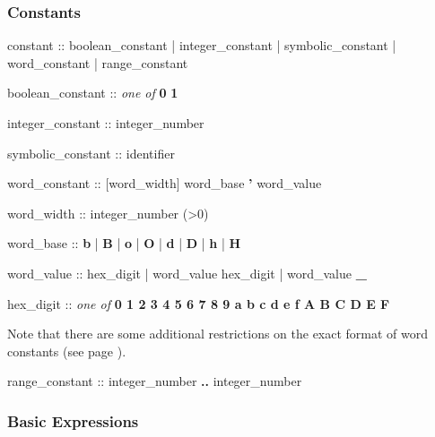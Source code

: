 \subsubsection{Constants}
\begin{Grammar}
constant ::
        boolean_constant
      | integer_constant
      | symbolic_constant
      | word_constant
      | range_constant
\end{Grammar}

\begin{Grammar}
boolean_constant :: \emph{one of}
        \textbf{0} \textbf{1}  
\end{Grammar}

\begin{Grammar}
integer_constant :: integer_number
\end{Grammar}

\begin{Grammar}
symbolic_constant :: identifier
\end{Grammar}

\begin{Grammar}
word_constant :: [word_width] word_base \textbf{'} word_value

word_width :: integer_number (>0)

word_base :: \textbf{b} | \textbf{B} | \textbf{o} | \textbf{O} | \textbf{d} | \textbf{D} | \textbf{h} |  \textbf{H}

word_value :: 
        hex_digit
      | word_value hex_digit
      | word_value \textbf{\_}

hex_digit :: \emph{one of}  
        \textbf{0 1 2 3 4 5 6 7 8 9 a b c d e f A B C D E F}
\end{Grammar}

Note that there are some additional restrictions on the exact format of word constants (see page \pageref{the notes on word constants}).

\begin{Grammar}
range_constant :: 
        integer_number \textbf{..} integer_number
\end{Grammar}

\subsubsection{Basic Expressions}

